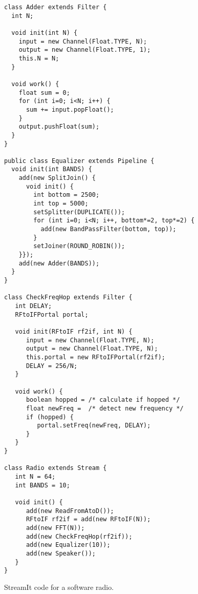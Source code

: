 \documentclass{sig-alternate}
\begin{document}
\begin{figure}
\vspace{-6pt}
\caption{Block diagram of a software radio.
\protect\label{fig:radiodiagram}}

\scriptsize
\begin{verbatim}
class Adder extends Filter {
  int N;

  void init(int N) {
    input = new Channel(Float.TYPE, N);
    output = new Channel(Float.TYPE, 1);
    this.N = N;
  }
  
  void work() {
    float sum = 0;
    for (int i=0; i<N; i++) {
      sum += input.popFloat();
    }
    output.pushFloat(sum);
  }
}

public class Equalizer extends Pipeline {
  void init(int BANDS) {
    add(new SplitJoin() {
      void init() {
        int bottom = 2500;
        int top = 5000;
        setSplitter(DUPLICATE());
        for (int i=0; i<N; i++, bottom*=2, top*=2) {
          add(new BandPassFilter(bottom, top));
        }
        setJoiner(ROUND_ROBIN());
    }});
    add(new Adder(BANDS));
  }
}
  
class CheckFreqHop extends Filter {
   int DELAY;
   RFtoIFPortal portal;

   void init(RFtoIF rf2if, int N) {
      input = new Channel(Float.TYPE, N);
      output = new Channel(Float.TYPE, N);
      this.portal = new RFtoIFPortal(rf2if);
      DELAY = 256/N;
   }

   void work() {
      boolean hopped = /* calculate if hopped */
      float newFreq =  /* detect new frequency */
      if (hopped) {
         portal.setFreq(newFreq, DELAY);
      }
   }
}

class Radio extends Stream {
   int N = 64;
   int BANDS = 10;

   void init() {
      add(new ReadFromAtoD());
      RFtoIF rf2if = add(new RFtoIF(N));
      add(new FFT(N));
      add(new CheckFreqHop(rf2if));
      add(new Equalizer(10));
      add(new Speaker());
   }
}
\end{verbatim}
\vspace{-16pt}
\caption{StreamIt code for a software radio.
\protect\label{fig:radiocode}}
\end{figure}
\end{document}
